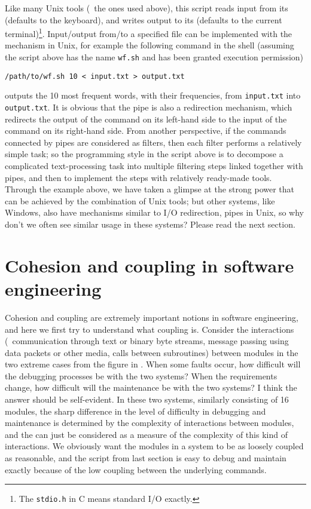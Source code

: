 Like many Unix tools (\eg~the ones used above), this script reads input from
its  (defaults to the keyboard), and writes output to
its  (defaults to the current terminal)\footnote{The
\texttt{stdio.h} in C means standard I/O exactly.}.  Input/output from/to a
specified file can be implemented with the  mechanism
in Unix, for example the following command in the shell (assuming the script
above has the name \verb|wf.sh| and has been granted execution permission)
\begin{wquoting}
\begin{Verbatim}
/path/to/wf.sh 10 < input.txt > output.txt
\end{Verbatim}
\end{wquoting}
outputs the 10 most frequent words, with their frequencies, from
\verb|input.txt| into \verb|output.txt|.  It is obvious that the pipe is also
a redirection mechanism, which redirects the output of the command on its
left-hand side to the input of the command on its right-hand side.  From another
perspective, if the commands connected by pipes are considered as filters, then
each filter performs a relatively simple task; so the programming style in the
script above is to decompose a complicated text-processing task into multiple
filtering steps linked together with pipes, and then to implement the steps
with relatively ready-made tools.  Through the example above, we have taken a
glimpse at the strong power that can be achieved by the combination of Unix
tools; but other systems, like Windows, also have mechanisms similar to I/O
redirection, pipes \etc{} in Unix, so why don't we often see similar
usage in these systems?  Please read the next section.

\section{Cohesion and coupling in software engineering}\label{sec:coupling}

Cohesion and coupling are extremely important notions in software engineering,
and here we first try to understand what coupling is.  Consider the interactions
(\eg~communication through text or binary byte streams, message passing using
data packets or other media, calls between subroutines) between modules in
the two extreme cases from the figure in \parencite{litt2014a}.  When some
faults occur, how difficult will the debugging processes be with the two
systems?  When the requirements change, how difficult will the maintenance be
with the two systems?  I think the answer should be self-evident.  In these two
systems, similarly consisting of 16 modules, the sharp difference in the level
of difficulty in debugging and maintenance is determined by the complexity
of interactions between modules, and the  can just
be considered as a measure of the complexity of this kind of interactions.
We obviously want the modules in a system to be as loosely coupled as
reasonable, and the script from last section is easy to debug and maintain
exactly because of the low coupling between the underlying commands.

